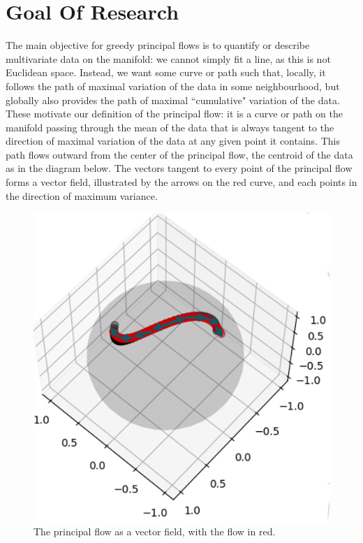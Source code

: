 \documentclass[12pt]{report}
\begin{document}
\section{Goal Of Research}
The main objective for greedy principal flows is to quantify or describe 
multivariate data on the manifold: we cannot simply fit a line, 
as this is not Euclidean space.
Instead, we want some curve or path such that,
locally, it follows the path of maximal variation of the data in some neighbourhood, 
but globally also provides the path of maximal ``cumulative" variation of the data.
These motivate our definition of the principal flow:
it is a curve or path on the manifold passing 
through the mean of the data 
that is always tangent to the direction of maximal variation 
of the data at any given point it contains. 
This path flows outward from the center of the principal flow, 
the centroid of the data as in the diagram below.
The vectors tangent to every point of the principal flow forms a vector field,
illustrated by the arrows on the red curve,
and each points in the direction of maximum variance.
\begin{figure}[ht]
    \begin{center}
        \includegraphics[scale=0.85]{flow_vector_field.PNG}
        \caption{The principal flow as a vector field, with the flow in red.}
        \label{fig:Vector Field Principal Flow}
    \end{center}
\end{figure}
\end{document}

